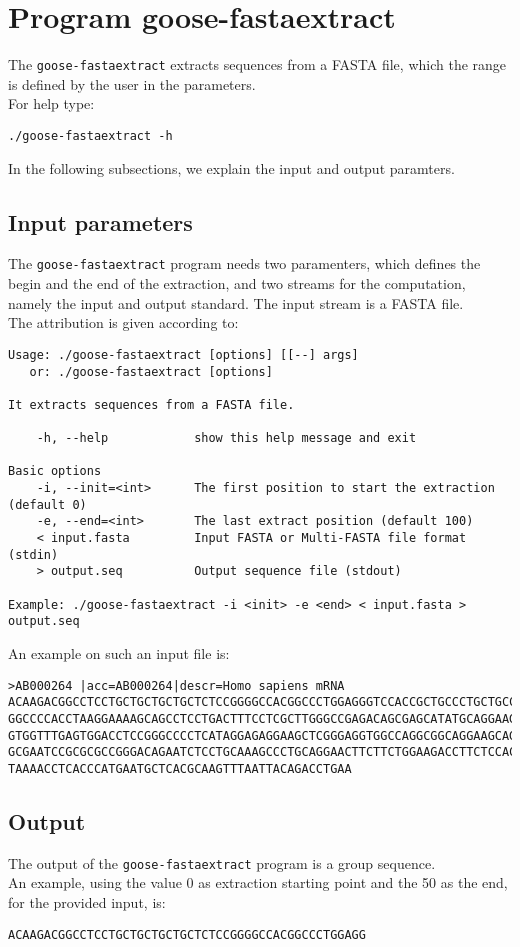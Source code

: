 \section{Program goose-fastaextract}
The \texttt{goose-fastaextract} extracts sequences from a FASTA file, which the range is defined by the user in the parameters.\\
For help type:
\begin{lstlisting}
./goose-fastaextract -h
\end{lstlisting}
In the following subsections, we explain the input and output paramters.

\subsection*{Input parameters}

The \texttt{goose-fastaextract} program needs two paramenters, which defines the begin and the end of the extraction, and two streams for the computation, namely the input and output standard. The input stream is a FASTA file.\\
The attribution is given according to:
\begin{lstlisting}
Usage: ./goose-fastaextract [options] [[--] args]
   or: ./goose-fastaextract [options]

It extracts sequences from a FASTA file.

    -h, --help            show this help message and exit

Basic options
    -i, --init=<int>      The first position to start the extraction (default 0)
    -e, --end=<int>       The last extract position (default 100)
    < input.fasta         Input FASTA or Multi-FASTA file format (stdin)
    > output.seq          Output sequence file (stdout)

Example: ./goose-fastaextract -i <init> -e <end> < input.fasta > output.seq
\end{lstlisting}
An example on such an input file is:
\begin{lstlisting}
>AB000264 |acc=AB000264|descr=Homo sapiens mRNA 
ACAAGACGGCCTCCTGCTGCTGCTGCTCTCCGGGGCCACGGCCCTGGAGGGTCCACCGCTGCCCTGCTGCCATTGTCCCC
GGCCCCACCTAAGGAAAAGCAGCCTCCTGACTTTCCTCGCTTGGGCCGAGACAGCGAGCATATGCAGGAAGCGGCAGGAA
GTGGTTTGAGTGGACCTCCGGGCCCCTCATAGGAGAGGAAGCTCGGGAGGTGGCCAGGCGGCAGGAAGCAGGCCAGTGCC
GCGAATCCGCGCGCCGGGACAGAATCTCCTGCAAAGCCCTGCAGGAACTTCTTCTGGAAGACCTTCTCCACCCCCCCAGC
TAAAACCTCACCCATGAATGCTCACGCAAGTTTAATTACAGACCTGAA
\end{lstlisting}

\subsection*{Output}
The output of the \texttt{goose-fastaextract} program is a group sequence.\\
An example, using the value 0 as extraction starting point and the 50 as the end, for the provided input, is:
\begin{lstlisting}
ACAAGACGGCCTCCTGCTGCTGCTGCTCTCCGGGGCCACGGCCCTGGAGG
\end{lstlisting}